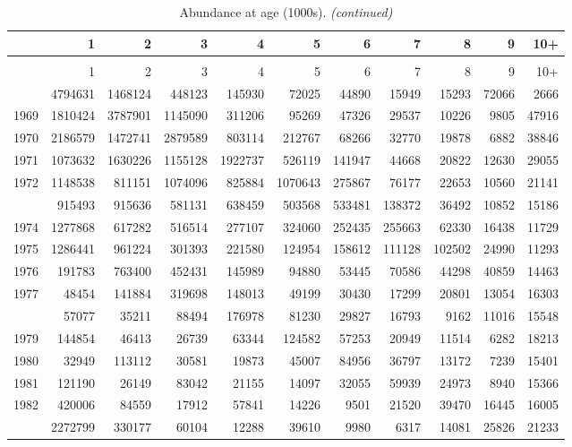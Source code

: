 \documentclass[
]{article}
\begin{document}
\begin{longtable}[t]{lrrrrrrrrrr}
\caption{\label{tab:NAA-table}Abundance at age (1000s).}\\
\toprule
  & 1 & 2 & 3 & 4 & 5 & 6 & 7 & 8 & 9 & 10+\\
\midrule
\endfirsthead
\caption[]{Abundance at age (1000s). \textit{(continued)}}\\
\toprule
  & 1 & 2 & 3 & 4 & 5 & 6 & 7 & 8 & 9 & 10+\\
\midrule
\endhead

\endfoot
\bottomrule
\endlastfoot
1968 & 4794631 & 1468124 & 448123 & 145930 & 72025 & 44890 & 15949 & 15293 & 72066 & 2666\\
1969 & 1810424 & 3787901 & 1145090 & 311206 & 95269 & 47326 & 29537 & 10226 & 9805 & 47916\\
1970 & 2186579 & 1472741 & 2879589 & 803114 & 212767 & 68266 & 32770 & 19878 & 6882 & 38846\\
1971 & 1073632 & 1630226 & 1155128 & 1922737 & 526119 & 141947 & 44668 & 20822 & 12630 & 29055\\
1972 & 1148538 & 811151 & 1074096 & 825884 & 1070643 & 275867 & 76177 & 22653 & 10560 & 21141\\
\addlinespace
1973 & 915493 & 915636 & 581131 & 638459 & 503568 & 533481 & 138372 & 36492 & 10852 & 15186\\
1974 & 1277868 & 617282 & 516514 & 277107 & 324060 & 252435 & 255663 & 62330 & 16438 & 11729\\
1975 & 1286441 & 961224 & 301393 & 221580 & 124954 & 158612 & 111128 & 102502 & 24990 & 11293\\
1976 & 191783 & 763400 & 452431 & 145989 & 94880 & 53445 & 70586 & 44298 & 40859 & 14463\\
1977 & 48454 & 141884 & 319698 & 148013 & 49199 & 30430 & 17299 & 20801 & 13054 & 16303\\
\addlinespace
1978 & 57077 & 35211 & 88494 & 176978 & 81230 & 29827 & 16793 & 9162 & 11016 & 15548\\
1979 & 144854 & 46413 & 26739 & 63344 & 124582 & 57253 & 20949 & 11514 & 6282 & 18213\\
1980 & 32949 & 113112 & 30581 & 19873 & 45007 & 84956 & 36797 & 13172 & 7239 & 15401\\
1981 & 121190 & 26149 & 83042 & 21155 & 14097 & 32055 & 59939 & 24973 & 8940 & 15366\\
1982 & 420006 & 84559 & 17912 & 57841 & 14226 & 9501 & 21520 & 39470 & 16445 & 16005\\
\addlinespace
1983 & 2272799 & 330177 & 60104 & 12288 & 39610 & 9980 & 6317 & 14081 & 25826 & 21233\\

\end{longtable}
\end{document}
